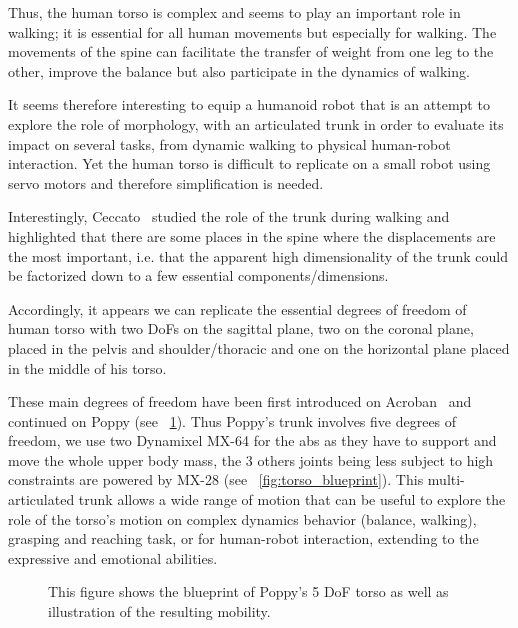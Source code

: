 Thus, the human torso is complex and seems to play an important role in walking; it is essential for all human movements but especially for walking. The movements of the spine can facilitate the transfer of weight from one leg to the other, improve the balance but also participate in the dynamics of walking.

It seems therefore interesting to equip a humanoid robot that is an attempt to explore the role of morphology, with an articulated trunk in order to evaluate its impact on several tasks, from dynamic walking to physical human-robot interaction. Yet the human torso is difficult to replicate on a small robot using servo motors and therefore simplification is needed.

Interestingly, Ceccato~\parencite{ceccatoPlos09} studied the role of the trunk during walking and highlighted that there are some places in the spine where the displacements are the most important, i.e. that the apparent high dimensionality of the trunk could be factorized down to a few essential components/dimensions.

Accordingly, it appears we can replicate the essential degrees of freedom of human torso with two DoFs on the sagittal plane, two on the coronal plane, placed in the pelvis and shoulder/thoracic and one on the horizontal plane placed in the middle of his torso.

These main degrees of freedom have been first introduced on Acroban~\parencite{ly2011bio} and continued on Poppy (see \figurename~\ref{fig:poppy_torso}).
Thus Poppy's trunk involves five degrees of freedom, we use two Dynamixel MX-64 for the abs as they have to support and move the whole upper body mass, the 3 others joints being less subject to high constraints are powered by MX-28 (see \figurename~\ref{fig:torso_blueprint}). This multi-articulated trunk allows a wide range of motion that can be useful to explore the role of the torso’s motion on complex dynamics behavior (balance, walking), grasping and reaching task, or for human-robot interaction, extending to the expressive and emotional abilities.

\begin{figure}[p]
\centering


    \hfill
    \caption{This figure shows the blueprint of Poppy's 5 DoF torso as well as illustration of the resulting mobility.}
    \label{fig:poppy_torso}
\end{figure}



